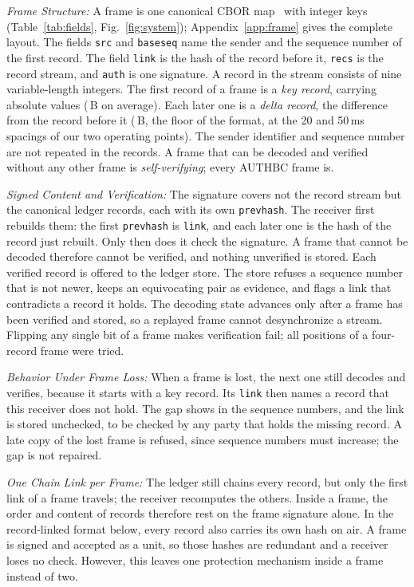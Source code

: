 \documentclass[lineno,pdflatex,sn-mathphys-num]{sn-jnl}
\newcommand{\runin}[1]{\textit{#1:}}
\renewcommand{\_}{\authbcunderscore\allowbreak}
\begin{document}
\runin{Frame Structure} A frame is one canonical CBOR map~\cite{rfc8949} with integer keys
(Table~\ref{tab:fields}, Fig.~\ref{fig:system}); Appendix~\ref{app:frame} gives the complete
layout. The fields \texttt{src} and \texttt{base\_seq} name the sender and the sequence number of
the first record. The field \texttt{link} is the hash of the record before it, \texttt{recs} is
the record stream, and \texttt{auth} is one signature. A record in the stream consists of nine
variable-length integers. The first record of a frame is a \emph{key record}, carrying absolute
values (\keyLean\,B on average). Each later one is a \emph{delta record}, the difference from the
record before it (\deltaLean\,B, the floor of the format, at the 20 and 50\,ms spacings of our two
operating points). The sender identifier and sequence number are not repeated in the records. A
frame that can be decoded and verified without any other frame is \emph{self-verifying}; every
AUTHBC frame is.

\runin{Signed Content and Verification} The signature covers not the record stream but the
canonical ledger records, each with its own \texttt{prev\_hash}. The receiver first rebuilds
them: the first \texttt{prev\_hash} is \texttt{link}, and each later one is the hash of the
record just rebuilt. Only then does it check the signature. A frame that cannot be decoded
therefore cannot be verified, and nothing unverified is stored. Each verified record is offered
to the ledger store. The store refuses a sequence number that is not newer, keeps an
equivocating pair as evidence, and flags a link that contradicts a record it holds. The decoding
state advances only after a frame has been verified and stored, so a replayed frame cannot
desynchronize a stream. Flipping any single bit of a frame makes verification fail; all
\bitflips{} positions of a four-record frame were tried.

\runin{Behavior Under Frame Loss} When a frame is lost, the next one still decodes and verifies,
because it starts with a key record. Its \texttt{link} then names a record that this receiver
does not hold. The gap shows in the sequence numbers, and the link is stored unchecked, to be
checked by any party that holds the missing record. A late copy of the lost frame is refused,
since sequence numbers must increase; the gap is not repaired.

\runin{One Chain Link per Frame} The ledger still chains every record, but only the first link of
a frame travels; the receiver recomputes the others. Inside a frame, the order and content of
records therefore rest on the frame signature alone. In the record-linked format below, every
record also carries its own hash on air. A frame is signed and accepted as a unit, so those
hashes are redundant and a receiver loses no check. However, this leaves one protection
mechanism inside a frame instead of two.
\end{document}
